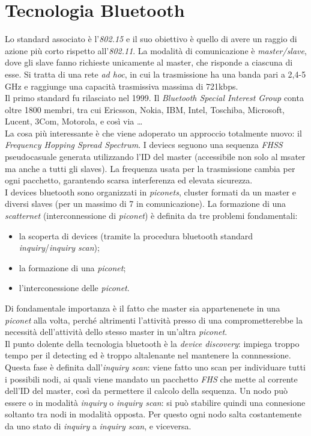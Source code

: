 \section{Tecnologia Bluetooth}
Lo standard associato è l'\textit{802.15} e il suo obiettivo è quello di avere un raggio di azione più corto rispetto all'\textit{802.11}.
La modalità di comunicazione è \textit{master/slave}, dove gli slave fanno richieste unicamente al master, che risponde a ciascuna di esse.
Si tratta di una rete \textit{ad hoc}, in cui la trasmissione ha una banda pari a 2,4-5 GHz e raggiunge una capacità trasmissiva massima di 721kbps. \\
Il primo standard fu rilasciato nel 1999. Il \textit{Bluetooth Special Interest Group} conta oltre 1800 membri, tra cui Ericsson, Nokia, IBM, Intel, Toschiba, Microsoft, Lucent, 3Com, Motorola, e così via \ldots \\
La cosa più interessante è che viene adoperato un approccio totalmente nuovo: il \textit{Frequency Hopping Spread Spectrum}. I deviecs seguono una sequenza \textit{FHSS} pseudocasuale generata utilizzando l'ID del master (accessibile non solo al msater ma anche a tutti gli slaves). La frequenza usata per la trasmissione cambia per ogni pacchetto, garantendo scarsa interferenza ed elevata sicurezza. \\
I devices bluetooth sono organizzati in \textit{piconets}, cluster formati da un master e diversi slaves (per un massimo di 7 in comunicazione). La formazione di una \textit{scatternet} (interconnessione di \textit{piconet}) è definita da tre problemi fondamentali:
\begin{itemize}
	\item la scoperta di devices (tramite la procedura bluetooth standard \textit{inquiry}/\textit{inquiry scan});
	\item la formazione di una \textit{piconet};
	\item l'interconessione delle \textit{piconet}.
\end{itemize}
Di fondamentale importanza è il fatto che master sia appartenenete in una \textit{piconet} alla volta, perché altrimenti l'attività presso di una comprometterebbe la necessità dell'attività dello stesso master in un'altra \textit{piconet}. \\
Il punto dolente della tecnologia bluetooth è la \textit{device discovery}: impiega troppo tempo per il detecting ed è troppo altalenante nel mantenere la connnessione. Questa fase è definita dall'\textit{inquiry scan}: viene fatto uno scan per individuare tutti i possibili nodi, ai quali viene mandato un pacchetto \textit{FHS} che mette al corrente dell'ID del master, così da permettere il calcolo della sequenza. Un nodo può essere o in modalità \textit{inquiry} o \textit{inquiry scan}: si può stabilire quindi una connesione soltanto tra nodi in modalità opposta. Per questo ogni nodo salta costantemente da uno stato di \textit{inquiry} a \textit{inquiry scan}, e viceversa. \\
